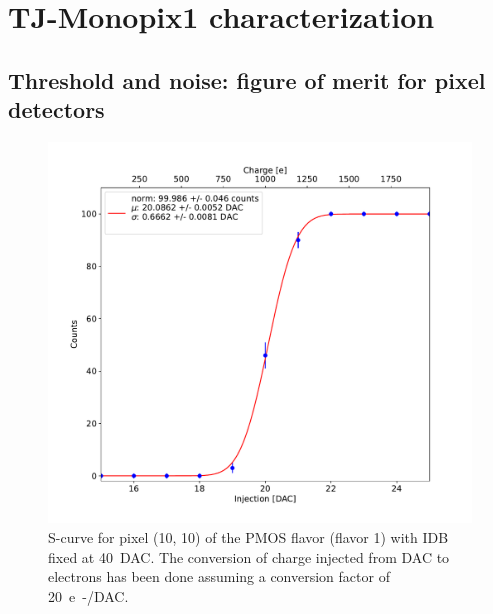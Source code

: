 
\section{TJ-Monopix1 characterization}
    

    \subsection{Threshold and noise: figure of merit for pixel detectors}
        \begin{figure}[h!]
            \centering
            \includegraphics[width=.6\linewidth]{figures/charaterization/scurve.pdf}
            \caption{S-curve for pixel (10, 10) of the PMOS flavor (flavor 1) with IDB fixed at \SI{40}{DAC}. The conversion of charge injected from DAC to electrons has been done assuming a conversion factor of \SI{20}{e-/DAC}. }
            \label{fig:scurve}
        \end{figure}   

